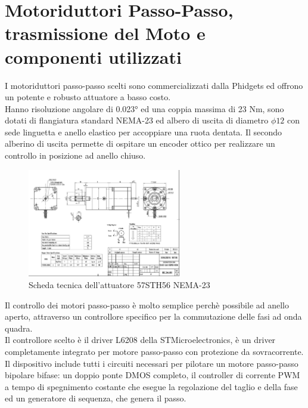 \documentclass[%
corpo=11pt,
twoside,
 stile=classica,
oldstyle,
greek,%
]{toptesi}
\begin{document}
	\section{Motoriduttori Passo-Passo, trasmissione del Moto e componenti utilizzati}
	I motoriduttori passo-passo scelti sono commercializzati dalla Phidgets ed offrono un potente e robusto attuatore a basso costo. \\
	Hanno risoluzione angolare di 0.023° ed una coppia massima di 23 Nm, sono dotati di flangiatura standard NEMA-23 ed albero di uscita di diametro $\phi 12$ con sede linguetta e anello elastico per accoppiare una ruota dentata. 
	Il secondo alberino di uscita permette di ospitare un encoder ottico per realizzare un controllo in posizione ad anello chiuso.\\
		\begin{figure}
		\centering
		\includegraphics[width=0.6\textwidth]{Screen/STEPPER.png}
		\caption{Scheda tecnica dell'attuatore 57STH56 NEMA-23}
		\label{fig:Stepper}
	\end{figure}
	Il controllo dei motori passo-passo è molto semplice perchè possibile ad anello aperto, attraverso un controllore specifico per la commutazione delle fasi ad onda quadra. \\
	Il controllore scelto è il driver L6208 della STMicroelectronics, è un driver completamente integrato per motore passo-passo con protezione da sovracorrente. Il dispositivo include tutti i circuiti necessari per pilotare un motore passo-passo bipolare bifase: un doppio ponte DMOS completo, il controller di corrente PWM a tempo di spegnimento costante che esegue la regolazione del taglio e della fase ed un generatore di sequenza, che genera il passo. \\
	
\end{document}
